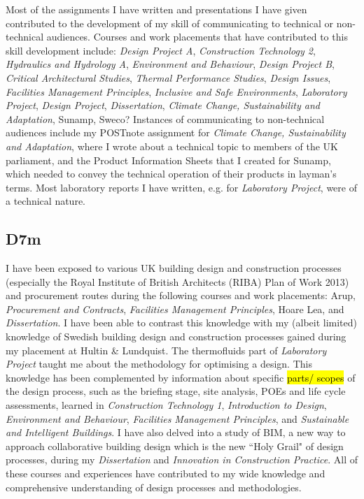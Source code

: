 Most of the assignments I have written and presentations I have given contributed to the development of my skill of communicating to technical or non-technical audiences.
Courses and work placements that have contributed to this skill development include:
\textit{Design Project A},
\textit{Construction Technology 2},
\textit{Hydraulics and Hydrology A},
\textit{Environment and Behaviour},
\textit{Design Project B},
\textit{Critical Architectural Studies},
\textit{Thermal Performance Studies},
\textit{Design Issues},
\textit{Facilities Management Principles},
\textit{Inclusive and Safe Environments},
\textit{Laboratory Project},
\textit{Design Project},
\textit{Dissertation},
\textit{Climate Change, Sustainability and Adaptation},
Sunamp,
Sweco?
Instances of communicating to non-technical audiences include my POSTnote assignment for \textit{Climate Change, Sustainability and Adaptation}, where I wrote about a technical topic to members of the UK parliament, and the Product Information Sheets that I created for Sunamp, which needed to convey the technical operation of their products in layman's terms.
Most laboratory reports I have written, e.g. for \textit{Laboratory Project}, were of a technical nature.


\subsection*{D7m}

I have been exposed to various UK building design and construction processes (especially the Royal Institute of British Architects (RIBA) Plan of Work 2013) and procurement routes during the following courses and work placements:
Arup,
\textit{Procurement and Contracts},
\textit{Facilities Management Principles},
Hoare Lea,
and
\textit{Dissertation}.
I have been able to contrast this knowledge with my (albeit limited) knowledge of Swedish building design and construction processes gained during my placement at Hultin \& Lundquist.
The thermofluids part of \textit{Laboratory Project} taught me about the methodology for optimising a design.
This knowledge has been complemented by information about specific \hl{parts/ scopes} of the design process, such as the briefing stage, site analysis, POEs and life cycle assessments, learned in
\textit{Construction Technology 1},
\textit{Introduction to Design},
\textit{Environment and Behaviour},
\textit{Facilities Management Principles},
and \textit{Sustainable and Intelligent Buildings}.
I have also delved into a study of BIM, a new way to approach collaborative building design which is the new ``Holy Grail" of design processes, during my \textit{Dissertation} and \textit{Innovation in Construction Practice}.
All of these courses and experiences have contributed to my wide knowledge and comprehensive understanding of design processes and methodologies.

